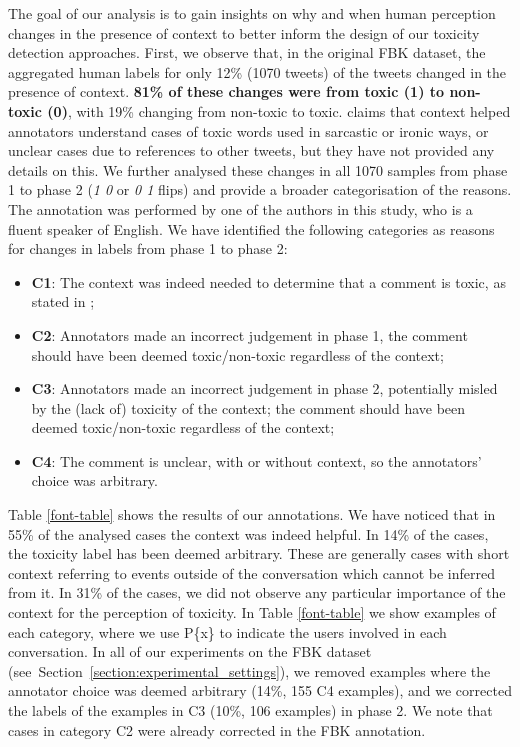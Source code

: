 \documentclass[acmsmall]{acmart}
\begin{document}
The goal of our analysis is to gain insights on why and when human perception changes in the presence of context to better inform  the design of our toxicity detection approaches. First, we observe that, in the original FBK dataset, the aggregated human labels for only 12\% (1070 tweets) of the tweets changed in the presence of context. {\bf 81\% of these changes were from toxic (1) to non-toxic (0)}, with 19\% changing from non-toxic to toxic. \cite{FBK} claims that context helped annotators understand cases of toxic words used in sarcastic or ironic ways, or unclear cases due to references to other tweets, but they have not provided any details on this. We further analysed these changes in all 1070 samples from phase 1 to phase 2 (\textit{1  0} or \textit{0  1} flips) and provide a broader categorisation of the reasons. The annotation was performed by one of the authors in this study, who is a fluent speaker of English. We have identified the following categories as reasons for changes in labels from phase 1 to phase 2:
\begin{itemize}
    \item {\bf C1}: The context was indeed needed to determine that a comment is toxic, as stated in \cite{FBK};
    \item  {\bf C2}: Annotators made an incorrect judgement in phase 1, the comment should have been deemed toxic/non-toxic regardless of the context;
    \item {\bf C3}: Annotators made an incorrect judgement in phase 2, potentially misled by the (lack of) toxicity of the context; the comment should have been deemed toxic/non-toxic regardless of the context; 
    \item {\bf C4}: The comment is unclear, with or without context, so the annotators' choice was arbitrary. 
\end{itemize}

Table \ref{font-table} shows the results of our annotations. We have noticed that in 55\% of the analysed cases the context was indeed helpful. In 14\% of the cases, the toxicity label has been deemed arbitrary. These are generally cases with short context referring to events outside of the conversation which cannot be inferred from it. In 31\% of the cases, we did not observe any particular importance of the context for the perception of toxicity. In Table \ref{font-table} we show examples of each category, where we use P\{x\} to indicate the users involved in each conversation. In all of our experiments on the FBK dataset (see~Section~\ref{section:experimental_settings}), we removed examples where the annotator choice was deemed arbitrary (14\%, 155 C4 examples), and we corrected the labels of the examples in C3 (10\%, 106 examples) in phase 2. We note that cases in category C2 were already corrected in the FBK annotation.  
\end{document}
